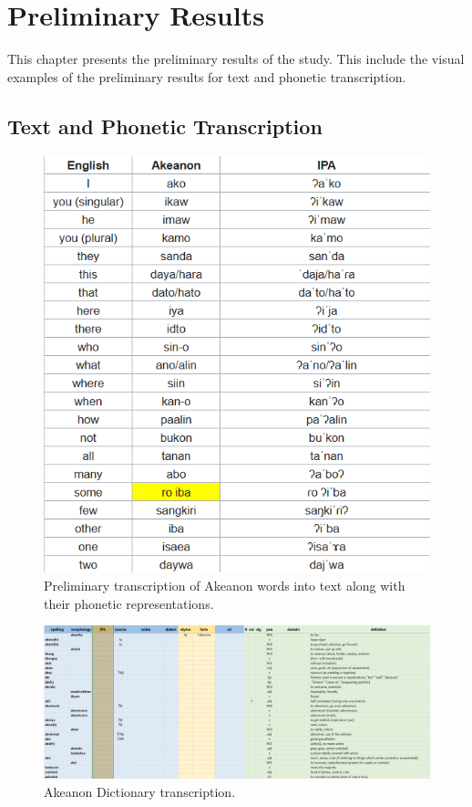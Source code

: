\chapter{Preliminary Results}
This chapter presents the preliminary results of the study. This include the visual examples of the preliminary results for text and phonetic transcription.

\section{Text and Phonetic Transcription}
\label{sec:TextandPhonetic}


\begin{figure}[h!]
	\centering
	\includegraphics[width=\textwidth]{prelim_transcription.png}
	\caption{Preliminary transcription of Akeanon words into text along with their phonetic representations.}
	\label{fig:PreliminaryTranscription}
\end{figure}
\label{sec:TextandPhonetic2}

\begin{figure}[h!]
	\centering
	\includegraphics[width=\textwidth]{dictionary.png}
	\caption{Akeanon Dictionary transcription.}
	\label{fig:Transcripted Akeanon Dictionary}
\end{figure}
